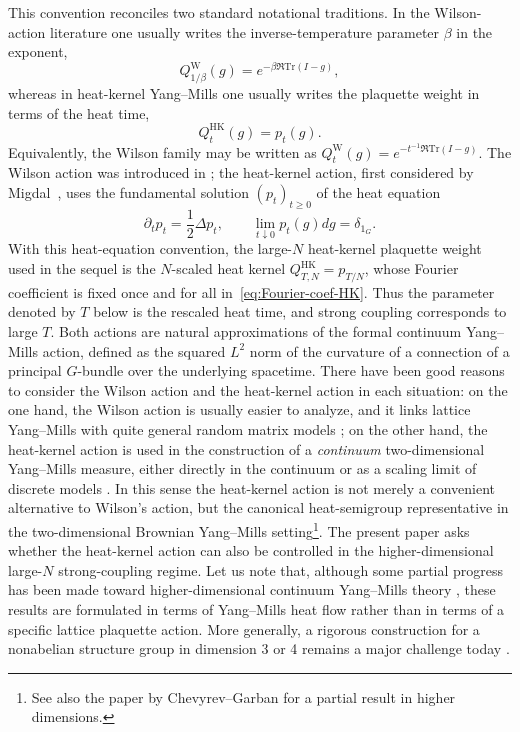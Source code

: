 \documentclass[11pt,a4paper,reqno]{amsart}
\theoremstyle{definition}
\theoremstyle{remark}
\newcommand\Tr{{\mathrm{Tr}}}
\newcommand\HK{{\mathrm{HK}}}
\begin{document}
This convention reconciles two standard notational traditions.  In the Wilson-action literature one usually writes the inverse-temperature parameter $\beta$ in the exponent,
\[
Q_{1/\beta}^{\mathrm W}(g)=e^{-\beta\Re\Tr(I-g)},
\]
whereas in heat-kernel Yang--Mills one usually writes the plaquette weight in terms of the heat time,
\[
Q_t^{\HK}(g)=p_t(g).
\]
Equivalently, the Wilson family may be written as $Q_t^{\mathrm W}(g)=e^{-t^{-1}\Re\Tr(I-g)}$.  The Wilson action was introduced in \cite{Wil74}; the heat-kernel action, first considered by Migdal~\cite{Mig75}, uses the fundamental solution $(p_t)_{t\geq 0}$ of the heat equation
\[
\partial_t p_t=\frac12\Delta p_t,\qquad \lim_{t\downarrow 0}p_t(g)dg=\delta_{1_G}.
\]
With this heat-equation convention, the large-$N$ heat-kernel plaquette weight used in the sequel is the $N$-scaled heat kernel $Q^{\HK}_{T,N}=p_{T/N}$, whose Fourier coefficient is fixed once and for all in~\eqref{eq:Fourier-coef-HK}.  Thus the parameter denoted by $T$ below is the rescaled heat time, and strong coupling corresponds to large $T$.
Both actions are natural approximations of the formal continuum Yang--Mills action, defined as the squared $L^2$ norm of the curvature of a connection of a principal $G$-bundle over the underlying spacetime. There have been good reasons to consider the Wilson action and the heat-kernel action in each situation: on the one hand, the Wilson action is usually easier to analyze, and it links lattice Yang--Mills with quite general random matrix models \cite{CPS25}; on the other hand, the heat-kernel action is used in the construction of a \emph{continuum} two-dimensional Yang--Mills measure, either directly in the continuum \cite{Dri89,Sen97,Lev03} or as a scaling limit of discrete models \cite{ChevShen26,DangNohra26,LemNoh26}. In this sense the heat-kernel action is not merely a convenient alternative to Wilson's action, but the canonical heat-semigroup representative in the two-dimensional Brownian Yang--Mills setting\footnote{See also the paper by Chevyrev--Garban \cite{ChevGar25} for a partial result in higher dimensions.}. The present paper asks whether the heat-kernel action can also be controlled in the higher-dimensional large-$N$ strong-coupling regime. Let us note that, although some partial progress has been made toward higher-dimensional continuum Yang--Mills theory \cite{CCHS24,CC24,ChevShen26b}, these results are formulated in terms of Yang--Mills heat flow rather than in terms of a specific lattice plaquette action. More generally, a rigorous construction for a nonabelian structure group in dimension 3 or 4 remains a major challenge today \cite{JW}. 
\end{document}
